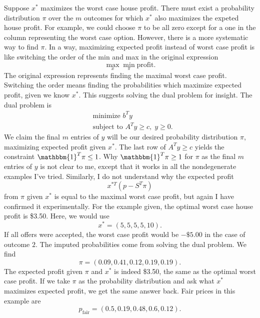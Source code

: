 \documentclass{article}
\begin{document}
\begin{enumerate}
\begin{enumerate}
            Suppose $x^\ast$ maximizes the worst case house profit. There must exist a probability distribution $\pi$ over the $m$ outcomes for which $x^\ast$ also maximizes the expeted house profit. For example, we could choose $\pi$ to be all zero except for a one in the column representing the worst case option. However, there is a more systematic way to find $\pi$. In a way, maximizing expected profit instead of worst case profit is like switching the order of the min and max in the original expression \[
                \max_x \min_\pi \text{profit}.
            \] The original expression represents finding the maximal worst case profit. Switching the order means finding the probabilities which maximize expected profit, given we know $x^\ast$. This suggests solving the dual problem for insight. The dual problem is \begin{align*}
                &\text{minimize } b^T y \\
                &\text{subject to } A^T y \geq c, \; y \geq 0.
            \end{align*} We claim the final $m$ entries of $y$ will be our desired probability distribution $\pi$, maximizing expected profit given $x^\ast$. The last row of $A^T y \geq c$ yields the constraint $\mathbbm{1}^T \pi \leq 1$. Why $\mathbbm{1}^T \pi \geq 1$ for $\pi$ as the final $m$ entries of $y$ is not clear to me, except that it works in all the nondegenerate examples I've tried. Similarly, I do not understand why the expected profit \[
                x^{\ast T} (p - S^T \pi)
            \] from $\pi$ given $x^\ast$ is equal to the maximal worst case profit, but again I have confirmed it experimentally. For the example given, the optimal worst case house profit is \$3.50. Here, we would use \[
                x^\ast = (5, 5, 5, 5, 10).
            \] If all offers were accepted, the worst case profit would be $-\$5.00$ in the case of outcome $2$. The imputed probabilities come from solving the dual problem. We find \[
                \pi = (0.09, 0.41, 0.12, 0.19, 0.19).
            \] The expected profit given $\pi$ and $x^\ast$ is indeed \$3.50, the same as the optimal worst case profit. If we take $\pi$ as the probability distribution and ask what $x^\ast$ maximizes expected profit, we get the same answer back. Fair prices in this example are \[
                p_\text{fair} = (0.5, 0.19, 0.48, 0.6, 0.12).
            \]
    \end{enumerate}


\end{enumerate}
\end{document}
